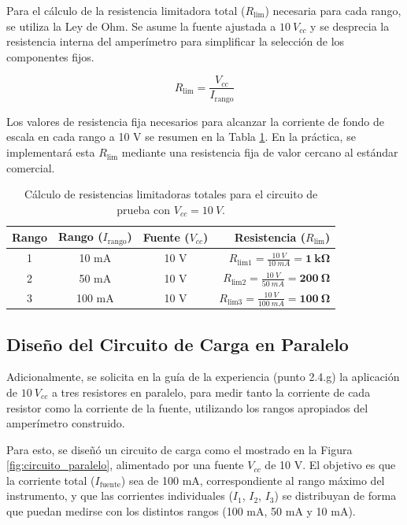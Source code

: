 Para el cálculo de la resistencia limitadora total ($R_{\text{lim}}$) necesaria para cada rango, se utiliza la Ley de Ohm. Se asume la fuente ajustada a $10~V_{cc}$ y se desprecia la resistencia interna del amperímetro para simplificar la selección de los componentes fijos.

$$ R_{\text{lim}} = \frac{V_{cc}}{I_{\text{rango}}} $$

Los valores de resistencia fija necesarios para alcanzar la corriente de fondo de escala en cada rango a 10 V se resumen en la Tabla \ref{tab:res_prueba}. En la práctica, se implementará esta $R_{\text{lim}}$ mediante una resistencia fija de valor cercano al estándar comercial.

\begin{table}[h!]
    \centering
    \caption{Cálculo de resistencias limitadoras totales para el circuito de prueba con $V_{cc} = 10~V$.}
    \label{tab:res_prueba}
    \begin{tabular}{cccr}
        \toprule
        \textbf{Rango} & \textbf{Rango ($I_{\text{rango}}$)} & \textbf{Fuente ($V_{cc}$)} & \textbf{Resistencia ($R_{\text{lim}}$)} \\
        \midrule
        1 & 10 mA & 10 V & $R_{\text{lim1}} = \frac{10~V}{10~mA} = \mathbf{1~k\Omega}$ \\
        2 & 50 mA & 10 V & $R_{\text{lim2}} = \frac{10~V}{50~mA} = \mathbf{200~\Omega}$ \\
        3 & 100 mA & 10 V & $R_{\text{lim3}} = \frac{10~V}{100~mA} = \mathbf{100~\Omega}$ \\
        \bottomrule
    \end{tabular}
\end{table}

\newpage
\subsection{Diseño del Circuito de Carga en Paralelo}
\label{sec:paralelo}

Adicionalmente, se solicita en la guía de la experiencia (punto 2.4.g) la aplicación de $10~V_{cc}$ a tres resistores en paralelo, para medir tanto la corriente de cada resistor como la corriente de la fuente, utilizando los rangos apropiados del amperímetro construido.

Para esto, se diseñó un circuito de carga como el mostrado en la Figura \ref{fig:circuito_paralelo}, alimentado por una fuente $V_{cc}$ de 10 V. El objetivo es que la corriente total ($I_{\text{fuente}}$) sea de 100 mA, correspondiente al rango máximo del instrumento, y que las corrientes individuales ($I_1$, $I_2$, $I_3$) se distribuyan de forma que puedan medirse con los distintos rangos (100 mA, 50 mA y 10 mA).

